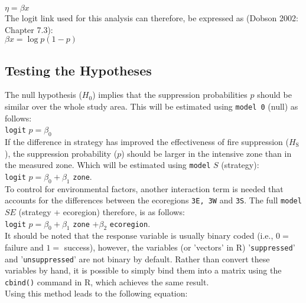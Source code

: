 \begin{spacing}{1.5}
$\eta = \beta x$ \\

\noindent The logit link used for this analysis can therefore, be expressed as (Dobson 2002: Chapter 7.3): \\

$\beta x = \log p(1-p)$

\subsection{Testing the Hypotheses}

The null hypothesis ($H_{\mathrm{0}}$) implies that the suppression probabilities $p$ should be similar over the whole study area. This will be estimated using \texttt{model 0} (null) as follows: \\

\texttt{logit} $p = {\beta}_{0}$ \\

\noindent If the difference in strategy has improved the effectiveness of fire suppression ($H_{\mathrm{S}}$), the suppression probability ($p$) should be larger in the intensive zone than in the measured zone.  Which will be estimated using \texttt{model} $S$ (strategy): \\

\texttt{logit} $p = {\beta}_{0} + {\beta}_{1}$ \texttt{zone}. \\

\noindent To control for environmental factors, another interaction term is needed that accounts for the differences between the ecoregions \texttt{3E, 3W} and \texttt{3S}. The full \texttt{model} $SE$ (strategy + ecoregion) therefore, is as follows: \\

\texttt{logit} $p = {\beta}_{0} + {\beta}_{1}$ \texttt{zone} $+  {\beta}_{2}$ \texttt{ecoregion}. \\

\noindent It should be noted that the response variable is usually binary coded (i.e., $0 =$ failure and $1 =$ success), however, the variables (or 'vectors' in R) '\texttt{suppressed}' and '\texttt{unsuppressed}' are not binary by default. Rather than convert these variables by hand, it is possible to simply bind them into a matrix using the \texttt{cbind()} command in R, which achieves the same result. \\

\noindent Using this method leads to the following equation: \\


\end{spacing}
